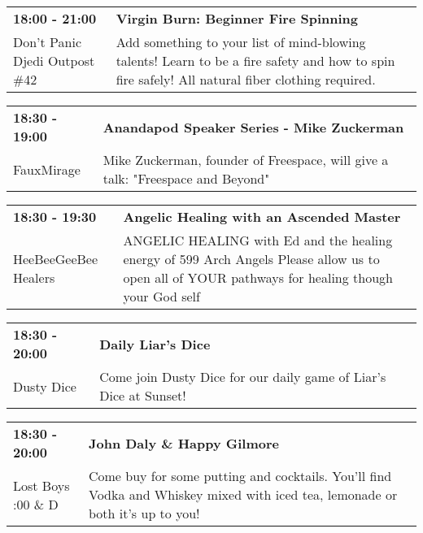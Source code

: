 \begin{tabular}{ p{1in} p{2.2in} }
    \textbf{18:00 - 21:00} & \textbf{Virgin Burn: Beginner Fire Spinning} \\
    Don't Panic Djedi Outpost \#42 \newline  & Add something to your list of mind-blowing talents! Learn to be a fire safety and how to spin fire safely! All natural fiber clothing required. \\
    \hline 
\end{tabular}
    
\begin{tabular}{ p{1in} p{2.2in} }
    \textbf{18:30 - 19:00} & \textbf{Anandapod Speaker Series - Mike Zuckerman} \\
    FauxMirage \newline  & Mike Zuckerman, founder of Freespace, will give a talk: "Freespace and Beyond" \\
    \hline 
\end{tabular}
    
\begin{tabular}{ p{1in} p{2.2in} }
    \textbf{18:30 - 19:30} & \textbf{Angelic Healing with an Ascended Master} \\
    HeeBeeGeeBee Healers \newline  & ANGELIC HEALING with Ed and the healing energy of 599 Arch Angels  Please allow us to open all of YOUR pathways for healing though your God self \\
    \hline 
\end{tabular}
    
\begin{tabular}{ p{1in} p{2.2in} }
    \textbf{18:30 - 20:00} & \textbf{Daily Liar's Dice} \\
    Dusty Dice \newline  & Come join Dusty Dice for our daily game of Liar's Dice at Sunset! \\
    \hline 
\end{tabular}
    
\begin{tabular}{ p{1in} p{2.2in} }
    \textbf{18:30 - 20:00} & \textbf{John Daly \& Happy Gilmore} \\
    Lost Boys \newline 4:00 \& D & Come buy for some putting and cocktails. You'll find Vodka and Whiskey mixed with iced tea, lemonade or both it's up to you! \\
    \hline 
\end{tabular}
    
